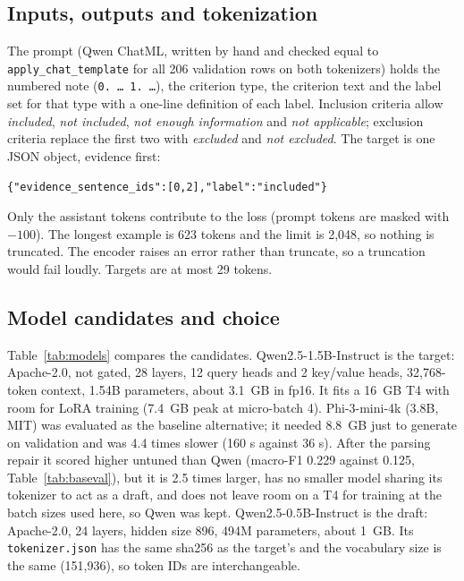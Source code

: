 \documentclass[conference]{IEEEtran}
\begin{document}
\begin{table}[t]
\centering\small
\caption{Split sizes and label counts (from \texttt{splits/manifest.json}). NEI is ``not enough information'', N/A is ``not applicable''. The training count includes the unusable annotation 883.}
\label{tab:split}
\resizebox{\columnwidth}{!}{}
\end{table}

\subsection{Inputs, outputs and tokenization}
The prompt (Qwen ChatML, written by hand and checked equal to \texttt{apply\_chat\_template} for all 206 validation rows on both tokenizers) holds the numbered note (\texttt{0. \ldots\ 1. \ldots}), the criterion type, the criterion text and the label set for that type with a one-line definition of each label. Inclusion criteria allow \emph{included}, \emph{not included}, \emph{not enough information} and \emph{not applicable}; exclusion criteria replace the first two with \emph{excluded} and \emph{not excluded}. The target is one JSON object, evidence first:
\begin{center}\small\texttt{\{"evidence\_sentence\_ids":[0,2],"label":"included"\}}\end{center}
Only the assistant tokens contribute to the loss (prompt tokens are masked with $-100$). The longest example is 623 tokens and the limit is 2,048, so nothing is truncated. The encoder raises an error rather than truncate, so a truncation would fail loudly. Targets are at most 29 tokens.

\subsection{Model candidates and choice}
Table~\ref{tab:models} compares the candidates. Qwen2.5-1.5B-Instruct is the target: Apache-2.0, not gated, 28 layers, 12 query heads and 2 key/value heads, 32,768-token context, 1.54B parameters, about 3.1~GB in fp16. It fits a 16~GB T4 with room for LoRA training (7.4~GB peak at micro-batch 4). Phi-3-mini-4k (3.8B, MIT) was evaluated as the baseline alternative; it needed 8.8~GB just to generate on validation and was 4.4 times slower (160 s against 36 s). After the parsing repair it scored higher untuned than Qwen (macro-F1 0.229 against 0.125, Table~\ref{tab:baseval}), but it is 2.5 times larger, has no smaller model sharing its tokenizer to act as a draft, and does not leave room on a T4 for training at the batch sizes used here, so Qwen was kept. Qwen2.5-0.5B-Instruct is the draft: Apache-2.0, 24 layers, hidden size 896, 494M parameters, about 1~GB. Its \texttt{tokenizer.json} has the same sha256 as the target's and the vocabulary size is the same (151,936), so token IDs are interchangeable.
\end{document}
